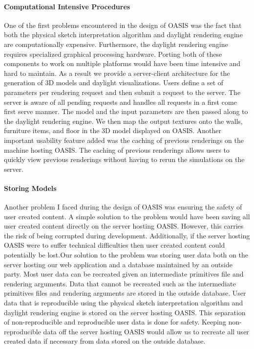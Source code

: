 \paragraph{Computational Intensive Procedures}
One of the first problems encountered in the design of OASIS was the fact that both the physical sketch interpretation algorithm and daylight rendering engine are computationally expensive. Furthermore, the daylight rendering engine requires specialized graphical processing hardware. Porting both of these components to work on multiple platforms would have been time intensive and hard to maintain. As a result we provide a server-client architecture for the generation of 3D models and daylight visualizations. Users define a set of parameters per rendering request and then submit a request to the server. The server is aware of all pending requests and handles all requests in a first come first serve manner. The model and the input parameters are then passed along to the daylight rendering engine. We then map the output  textures onto the walls, furniture items, and floor in the 3D model displayed on OASIS. Another important usability feature added was the caching of previous renderings on the machine hosting OASIS. The caching of previous renderings allows users to quickly view previous renderings without having to rerun the simulations on the server.	
 
\paragraph{Storing Models}
Another problem I faced during the design of OASIS was ensuring the safety of user created content. 
A simple solution to the problem would have been saving all user created content directly on the server hosting OASIS.
However, this carries the risk of being corrupted during development. Additionally, if the server hosting OASIS were to suffer technical difficulties then user created content could potentially be lost.Our solution to the problem was storing user data both on the server hosting our web application and a database maintained by an outside party.
Most user data can be recreated given an intermediate primitives file and rendering arguments. Data that cannot be recreated such as the intermediate primitives files and rendering arguments are stored in the outside database.
User data that is reproducible using the physical sketch interpretation algorithm and daylight rendering engine is stored on the server hosting OASIS. This separation of non-reproducible and reproducible user data is done for safety. Keeping non-reproducible data off the server hosting OASIS would allow us to recreate all user created data if necessary from data stored on the outside database.

